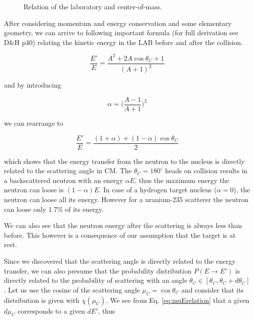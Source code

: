 \begin{figure}[ht!]
\protect {}\protect
\caption{\label{fig:cmlabrelation} \footnotesize{Relation of the laboratory and center-of-mass.}}
\end{figure}

After considering momentum and energy conservation and some elementary geometry, we can arrive to following important formula (for full derivation see D\&H p40) relating the kinetic energy in the LAB before and after the collision.

$$\frac{E'}{E}=\frac{A^2+2A\cos\theta_C+1}{(A+1)^2}$$

\noindent and by introducing 

$$\alpha=\Big(\frac{A-1}{A+1}\Big)^2$$

\noindent we can rearrange to

\begin{equation}\label{eq:muErelation}
\frac{E'}{E}=\frac{(1+\alpha)+(1-\alpha)\cos\theta_C}{2}
\end{equation}

\noindent which shows that the energy transfer from the neutron to the nucleus is directly related to the scattering angle in CM. The $\theta_C=180^\circ$ heads on collision results in a backscattered neutron with an energy $\alpha E$, thus the maximum energy the neutron can loose is $(1-\alpha)E$. In case of a hydrogen target nucleus ($\alpha=0$), the neutron can loose all its energy. However for a uranium-235 scatterer the neutron can loose only 1.7\% of its energy.

We can also see that the neutron energy after the scattering is always less than before. This however is a consequence of our assumption that the target is at rest.

Since we discovered that the scattering angle is directly related to the energy transfer, we can also presume that the probability distribution $P(E\rightarrow E')$ is directly related to the probability of scattering with an angle $\theta_C \in [\theta_C,\theta_C+d\theta_C]$. Let us use the cosine of the scattering angle $\mu_C=\cos\theta_C$ and consider that its distribution is given with $\chi(\mu_C)$. We see from Eq. \eqref{eq:muErelation} that a given $d\mu_C$ corresponds to a given $dE'$, thus 

